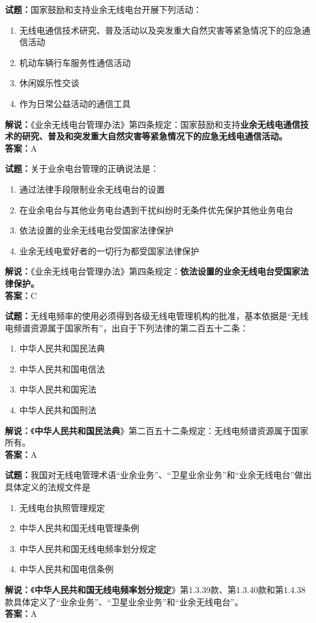 \documentclass{ctexbook}
\begin{document}
\bigskip


\noindent\textbf{试题：}国家鼓励和支持业余无线电台开展下列活动：
\begin{enumerate}[leftmargin=3em]
\item 无线电通信技术研究、普及活动以及突发重大自然灾害等紧急情况下的应急通信活动
\item 机动车辆行车服务性通信活动
\item 休闲娱乐性交谈
\item 作为日常公益活动的通信工具
\end{enumerate}
\noindent\textbf{解说：}《业余无线电台管理办法》第四条规定：国家鼓励和支持\textbf{业余无线电通信技术的研究、普及和突发重大自然灾害等紧急情况下的应急无线电通信活动。}\\\noindent\textbf{答案：}A

\bigskip


\noindent\textbf{试题：}关于业余电台管理的正确说法是：
\begin{enumerate}[leftmargin=3em]
\item 通过法律手段限制业余无线电台的设置
\item 在业余电台与其他业务电台遇到干扰纠纷时无条件优先保护其他业务电台
\item 依法设置的业余无线电台受国家法律保护
\item 业余无线电爱好者的一切行为都受国家法律保护
\end{enumerate}
\noindent\textbf{解说：}《业余无线电台管理办法》第四条规定：\textbf{依法设置的业余无线电台受国家法律保护。}\\\noindent\textbf{答案：}C

\bigskip


\noindent\textbf{试题：}无线电频率的使用必须得到各级无线电管理机构的批准，基本依据是“无线电频谱资源属于国家所有”，出自于下列法律的第二百五十二条：
\begin{enumerate}[leftmargin=3em]
\item 中华人民共和国民法典
\item 中华人民共和国电信法
\item 中华人民共和国宪法
\item 中华人民共和国刑法
\end{enumerate}
\noindent\textbf{解说：}《\textbf{中华人民共和国民法典}》第二百五十二条规定：无线电频谱资源属于国家所有。\\\noindent\textbf{答案：}A

\bigskip


\noindent\textbf{试题：}我国对无线电管理术语“业余业务”、“卫星业余业务”和“业余无线电台”做出具体定义的法规文件是
\begin{enumerate}[leftmargin=3em]
\item 无线电台执照管理规定
\item 中华人民共和国无线电管理条例
\item 中华人民共和国无线电频率划分规定
\item 中华人民共和国电信条例
\end{enumerate}
\textbf{解说：}《\textbf{中华人民共和国无线电频率划分规定}》第1.3.39款、第1.3.40款和第1.4.38款具体定义了“业余业务”、“卫星业余业务”和“业余无线电台”。\\\noindent\textbf{答案：}A
\end{document}
